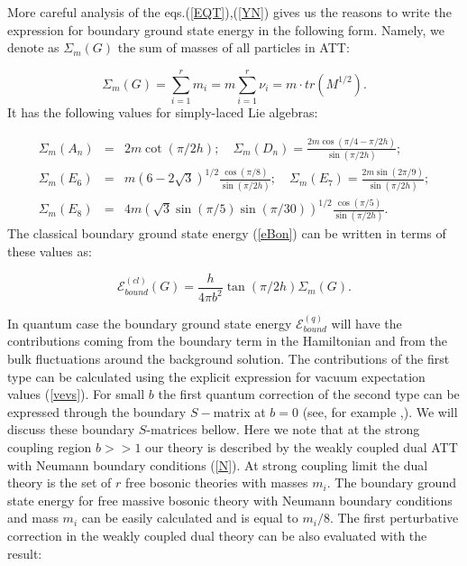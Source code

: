\documentclass[a4paper,12pt]{article}
\begin{document}
More careful analysis of the eqs.(\ref{EQT}),(\ref{YN}) gives us the
reasons to write the expression for boundary ground state energy in the
following form. Namely, we denote as $\Sigma _m(G)$ the sum of masses of all
particles in ATT:

\begin{equation}
\Sigma _m(G)=\sum_{i=1}^rm_i=m\sum_{i=1}^r\nu _i=m\cdot tr(M^{1/2}).
\label{sIg}
\end{equation}
It has the following values for simply-laced Lie algebras:

\begin{eqnarray}
\Sigma _m(A_{n}) &=&2m\cot (\pi /2h);\quad 
\Sigma _m(D_n)=\frac{2m\cos
(\pi /4-\pi /2h)}{\sin (\pi /2h)};  \nonumber \\
\Sigma _m(E_6) &=&m(6-2\sqrt{3})^{1/2}
\frac{\cos (\pi /8)}{\sin (\pi /2h)};
\quad \Sigma _m(E_7)=\frac{2m\sin (2\pi /9)}{\sin (\pi /2h)}; 
 \nonumber \\
\Sigma _m(E_8) &=&4m(\sqrt{3}\sin (\pi /5)\sin (\pi /30))^{1/2}\frac{\cos
(\pi /5)}{\sin \left( \pi /2h\right) }.  \label{sUm}
\end{eqnarray}
The classical boundary ground state energy (\ref{eBon}) can be written in
terms of these values as:

\begin{equation}
\mathcal{E}_{bound}^{(cl)}(G)=\frac h{4\pi b^2}\tan (\pi /2h)\Sigma _m(G).
\label{eCl}
\end{equation}

In quantum case the boundary ground state energy $\mathcal{E}_{bound}^{(q)}$
will have the contributions coming from the boundary term in the Hamiltonian
and from the bulk fluctuations around the background solution. The
contributions of the first type can be calculated using the explicit
expression for vacuum expectation values (\ref{vevs}). For small $b$ the
first quantum correction of the second type can be expressed through the
boundary $S-$matrix at $b=0$ (see, for example \cite{COD},\cite{COT}). We
will discuss these boundary $S$-matrices bellow. Here we note that at the
strong coupling region $b>>1$ our theory is described by the weakly coupled
dual ATT with Neumann boundary conditions (\ref{N}). At strong coupling
limit the dual theory is the set of $r$ free bosonic theories with masses $m_i$.
The boundary ground state energy for free massive bosonic theory with
Neumann boundary conditions and mass $m_i$ can be easily calculated and is
equal to $m_i/8$. The first perturbative correction in the weakly coupled
dual theory can be also evaluated with the result:
\end{document}
